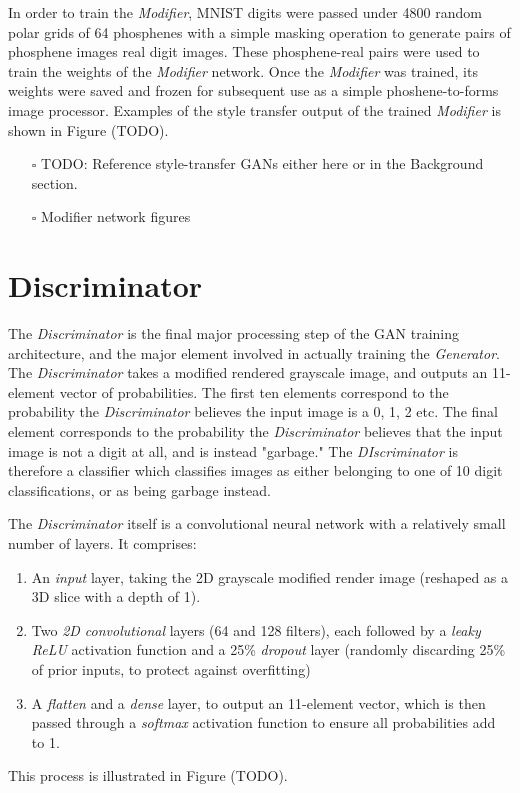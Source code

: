 \documentclass[a4paper,11pt,openany]{book}
\begin{document}
In order to train the \emph{Modifier}, MNIST digits were passed under 4800 random polar grids of 64 phosphenes with a simple masking operation to generate pairs of phosphene images real digit images.
These phosphene-real pairs were used to train the weights of the \emph{Modifier} network.
Once the \emph{Modifier} was trained, its weights were saved and frozen for subsequent use as a simple phoshene-to-forms image processor.
Examples of the style transfer output of the trained \emph{Modifier} is shown in Figure (TODO).

\begin{itemize}
\item[{$\square$}] TODO: Reference style-transfer GANs either here or in the Background section.
\item[{$\square$}] Modifier network figures
\end{itemize}

\section*{Discriminator}
\label{sec:org4755bb4}

The \emph{Discriminator} is the final major processing step of the GAN training architecture, and the major element involved in actually training the \emph{Generator}.
The \emph{Discriminator} takes a modified rendered grayscale image, and outputs an 11-element vector of probabilities.
The first ten elements correspond to the probability the \emph{Discriminator} believes the input image is a 0, 1, 2 etc.
The final element corresponds to the probability the \emph{Discriminator} believes that the input image is not a digit at all, and is instead "garbage."
The \emph{DIscriminator} is therefore a classifier which classifies images as either belonging to one of 10 digit classifications, or as being garbage instead.

The \emph{Discriminator} itself is a convolutional neural network with a relatively small number of layers. It comprises:
\begin{enumerate}
\item An \emph{input} layer, taking the 2D grayscale modified render image (reshaped as a 3D slice with a depth of 1).
\item Two \emph{2D convolutional} layers (64 and 128 filters), each followed by a \emph{leaky ReLU} activation function and a 25\% \emph{dropout} layer (randomly discarding 25\% of prior inputs, to protect against overfitting)
\item A \emph{flatten} and a \emph{dense} layer, to output an 11-element vector, which is then passed through a \emph{softmax} activation function to ensure all probabilities add to 1.
\end{enumerate}
This process is illustrated in Figure (TODO).
\end{document}

